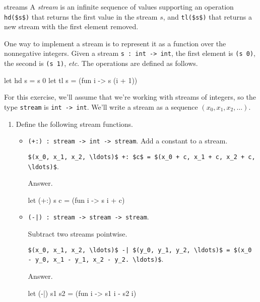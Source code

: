 %
\begin{exercise}{streams}
A \emph{stream} is an infinite sequence of values supporting an operation \hbox{\lstinline/hd($s$)/} that
returns the first value in the stream $s$, and \hbox{\lstinline/tl($s$)/} that returns a new stream with
the first element removed.

One way to implement a stream is to represent it as a function over the nonnegative integers.  Given
a stream \hbox{\lstinline/s : int -> int/}, the first element is \hbox{\lstinline/(s 0)/}, the second
is \hbox{\lstinline/(s 1)/}, \emph{etc}.  The operations are defined as follows.

\begin{ocaml}
let hd s = s 0
let tl s = (fun i -> s (i + 1))
\end{ocaml}
%
For this exercise, we'll assume that we're working with streams of integers, so the
type \hbox{\lstinline/stream/} is \hbox{\lstinline/int -> int/}.  We'll write a stream as a sequence $(x_0, x_1,
x_2, \ldots)$.

\begin{enumerate}
\item Define the following stream functions.
\begin{itemize}
\item \lstinline!(+:) : stream -> int -> stream!. Add a constant to a stream.

\lstinline!$(x_0, x_1, x_2, \ldots)$ +: $c$ = $(x_0 + c, x_1 + c, x_2 + c, \ldots)$!.

\begin{answer}\ifanswers
Answer.
\begin{ocaml}
let (+:) s c = (fun i -> s i + c)
\end{ocaml}
\fi\end{answer}

\item \lstinline!(-|) : stream -> stream -> stream!.

Subtract two streams pointwise.

\lstinline!$(x_0, x_1, x_2, \ldots)$ -| $(y_0, y_1, y_2, \ldots)$ = $(x_0 - y_0, x_1 - y_1, x_2 - y_2. \ldots)$!.

\begin{answer}\ifanswers
Answer.
\begin{ocaml}
let (-|) s1 s2 = (fun i -> s1 i - s2 i)
\end{ocaml}
\fi\end{answer}


\end{itemize}
\end{enumerate}
\end{exercise}

